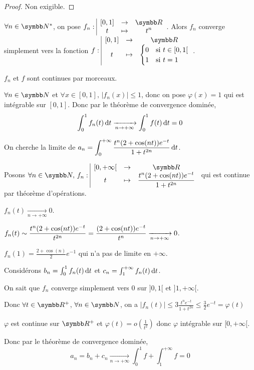 \begin{proof}
    Non exigible. 
\end{proof}

\begin{exemple}
    $\forall n \in \N^*$, on pose $\fonction {f_n}{[0, 1]}{\R}{t}{t^n}$. 
    Alors $f_n$ converge simplement vers la fonction $\fonction f {[0, 1]}{\R}{t}{\begin{cases}
        0 & \text{si } t \in [0, 1[ \\
        1 & \text{si } t = 1
    \end{cases}}$.

    \svspace $f_n$ et $f$ sont continues par morceaux. 

    $\forall n \in \N$ et $\forall x \in [0, 1], \, |f_n(x)| \leqslant 1$, donc on pose 
    $\varphi(x) = 1$ qui est intégrable sur $[0, 1]$. Donc par le théorème de convergence 
    dominée, $$\int_0^1 f_n(t) \,\mathrm{d}t \xrightarrow[n \to + \infty]{} \int_0^1 f(t) \,\mathrm{d}t = 0$$
\end{exemple}

\begin{exemple}
    On cherche la limite de $\displaystyle a_n = \int_{0 }^{ + \infty } \frac{t^n(2 + \cos (nt)) e^{-t}}{1 + t^{2n}} \,\mathrm{d}t$.

    \svspace Posons $\forall n \in \N, \, \fonction {f_n}{[0, + \infty[}{\R}{t}{\frac{t^n(2 + \cos (nt)) e^{-t}}{1 + t^{2n}}}$ qui
    est continue par théorème d'opérations.


    \avspace $f_n(t) \xrightarrow[n \to + \infty]{} 0$.


    \avspace $\displaystyle f_n(t) \sim \frac{t^n(2 + \cos(nt))e^{-t}}{t^{2n}} = \frac{(2 + \cos(nt))e^{-t}}{t^n} \xrightarrow[n \to + \infty]{} 0$.

    $f_n(1) = \frac{2 + \cos(n)}{2}e^{-1}$ qui n'a pas de limite en $+\infty$. 

    Considérons $b_n = \int_0^1 f_n(t) \,\mathrm{d}t$ et $c_n = \int_1^{+ \infty} f_n(t) \,\mathrm{d}t$.

    On sait que $f_n$ converge simplement vers $0$ sur $]0, 1[$ et $]1, + \infty[$.

    Donc $\forall t \in \R^+$, $\forall n \in \N$, on a $|f_n(t)| \leqslant 3 \frac{t^n e^{-t}}{1 + t^{2n}} \leqslant \frac 3 2 e^{-t} = \varphi(t)$

    $\varphi$ est continue sur $\R^+$ et $\varphi(t) = o\left( \frac 1 {t^2} \right)$ donc $\varphi$ 
    intégrable sur $[0, + \infty[$.

    Donc par le théorème de convergence dominée, $$a_n = b_n + c_n \xrightarrow[n \to + \infty]{} \int_{0}^{1} f + \int_1^{+ \infty} f = 0$$
\end{exemple}

